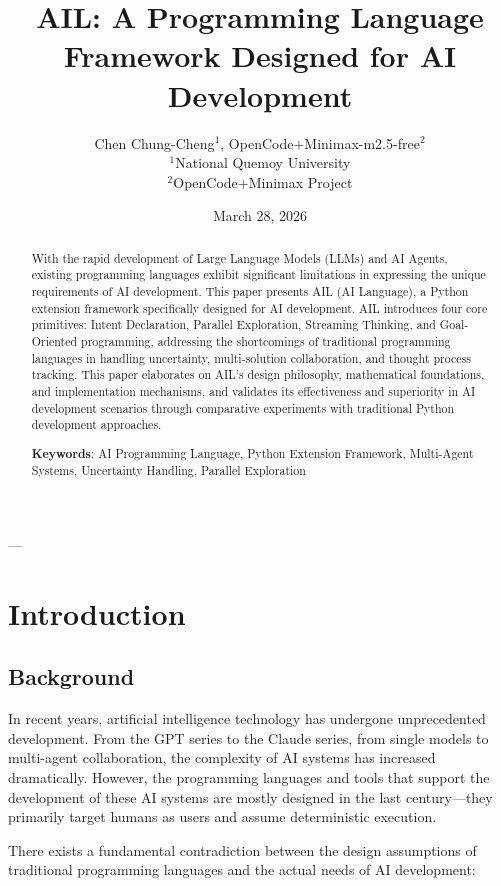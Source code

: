 \documentclass[12pt,a4paper]{article}
\title{AIL: A Programming Language Framework Designed for AI Development}
\author{Chen Chung-Cheng$^{1}$, OpenCode+Minimax-m2.5-free$^{2}$ \\
$^{1}$National Quemoy University \\
$^{2}$OpenCode+Minimax Project \\
\date{March 28, 2026}}
\begin{document}
\maketitle

\begin{abstract}
With the rapid development of Large Language Models (LLMs) and AI Agents, existing programming languages exhibit significant limitations in expressing the unique requirements of AI development. This paper presents AIL (AI Language), a Python extension framework specifically designed for AI development. AIL introduces four core primitives: Intent Declaration, Parallel Exploration, Streaming Thinking, and Goal-Oriented programming, addressing the shortcomings of traditional programming languages in handling uncertainty, multi-solution collaboration, and thought process tracking. This paper elaborates on AIL's design philosophy, mathematical foundations, and implementation mechanisms, and validates its effectiveness and superiority in AI development scenarios through comparative experiments with traditional Python development approaches.

\textbf{Keywords}: AI Programming Language, Python Extension Framework, Multi-Agent Systems, Uncertainty Handling, Parallel Exploration
\end{abstract}

---

\section{Introduction}

\subsection{Background}

In recent years, artificial intelligence technology has undergone unprecedented development. From the GPT series to the Claude series, from single models to multi-agent collaboration, the complexity of AI systems has increased dramatically. However, the programming languages and tools that support the development of these AI systems are mostly designed in the last century—they primarily target humans as users and assume deterministic execution.

There exists a fundamental contradiction between the design assumptions of traditional programming languages and the actual needs of AI development:
\end{document}

